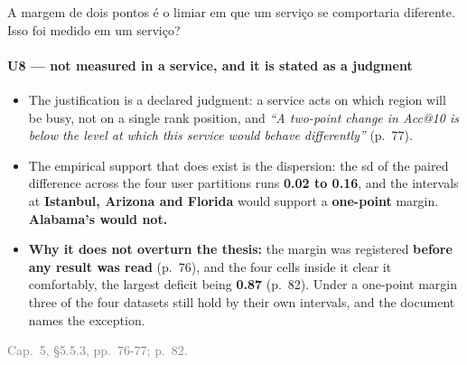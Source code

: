 \documentclass{beamer}
\begin{document}
\begin{frame}[noframenumbering]{A margem de dois pontos é o limiar em que um serviço se comportaria diferente. Isso foi medido em um serviço?}
    \framesubtitle{U8 --- not measured in a service, and it is stated as a judgment}
    \hypertarget{u8}{}
    \small
    \begin{itemize}\setlength{\itemsep}{0pt}\setlength{\parskip}{0pt}
        \item The justification is a declared judgment: a service acts on which region will be busy, not on a single rank position, and \textit{``A two-point change in Acc@10 is below the level at which this service would behave differently''} (p.~77).
        \item The empirical support that does exist is the dispersion: the sd of the paired difference across the four user partitions runs \textbf{0.02 to 0.16}, and the intervals at \textbf{Istanbul, Arizona and Florida} would support a \textbf{one-point} margin. \textbf{Alabama's would not.}
        \item \textbf{Why it does not overturn the thesis:} the margin was registered \textbf{before any result was read} (p.~76), and the four cells inside it clear it comfortably, the largest deficit being \textbf{0.87} (p.~82). Under a one-point margin three of the four datasets still hold by their own intervals, and the document names the exception.
    \end{itemize}
    \vfill
    {\scriptsize
    \begin{minipage}[b]{0.775\linewidth}\raggedright\textcolor{gray}{Cap.~5, §5.5.3, pp.~76-77; p.~82.}\end{minipage}\hfill
    \begin{minipage}[b]{0.20\linewidth}\raggedleft \hyperlink{b15}{}\hyperlink{b0}{}\end{minipage}}
\end{frame}

\end{document}
